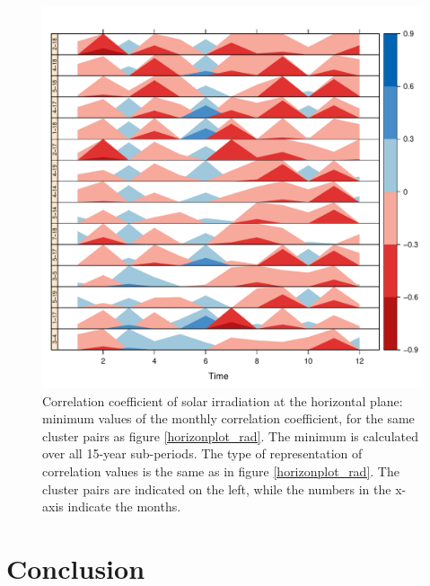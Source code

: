 \begin{figure}[h!]
\includegraphics[scale=0.6]{figs/capitulo5/horizonplot_months_rad2}
\caption{Correlation coefficient of solar irradiation at the horizontal plane: minimum values of the monthly correlation coefficient, for the same cluster pairs as figure \ref{horizonplot_rad}. The minimum is calculated over all 15-year sub-periods. The type of representation of correlation values is the same as in figure \ref{horizonplot_rad}. The cluster pairs are indicated on the left, while the numbers in the x-axis indicate the months.}
\label{horizonplot_months_rad}
\end{figure}

\section{Conclusion}

